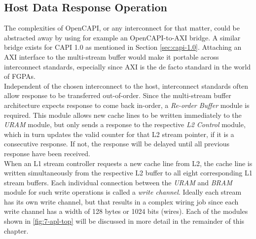 \subsection{Host Data Response Operation}
The complexities of OpenCAPI, or any interconnect for that matter, could be abstracted away by using for example an OpenCAPI-to-AXI bridge. A similar bridge exists for CAPI 1.0 as mentioned in Section \ref{sec:capi-1.0}. Attaching an AXI interface to the multi-stream buffer would make it portable across interconnect standards, especially since AXI is the de facto standard in the world of FGPAs.\\
Independent of the chosen interconnect to the host, interconnect standards often allow response to be transferred out-of-order. Since the multi-stream buffer architecture expects response to come back in-order, a \textit{Re-order Buffer} module is required. This module allows new cache lines to be written immediately to the \textit{URAM} module, but only sends a response to the respective \textit{L2 Control} module, which in turn updates the valid counter for that L2 stream pointer, if it is a consecutive response. If not, the response will be delayed until all previous response have been received.\\
When an L1 stream controller requests a new cache line from L2, the cache line is written simultaneously from the respective L2 buffer to all eight corresponding L1 stream buffers. Each individual connection between the \textit{URAM} and \textit{BRAM} module for such write operations is called a \textit{write channel}. Ideally each stream has its own write channel, but that results in a complex wiring job since each write channel has a width of 128 bytes or 1024 bits (wires). Each of the modules shown in \autoref{fig:7-apl-top} will be discussed in more detail in the remainder of this chapter.



